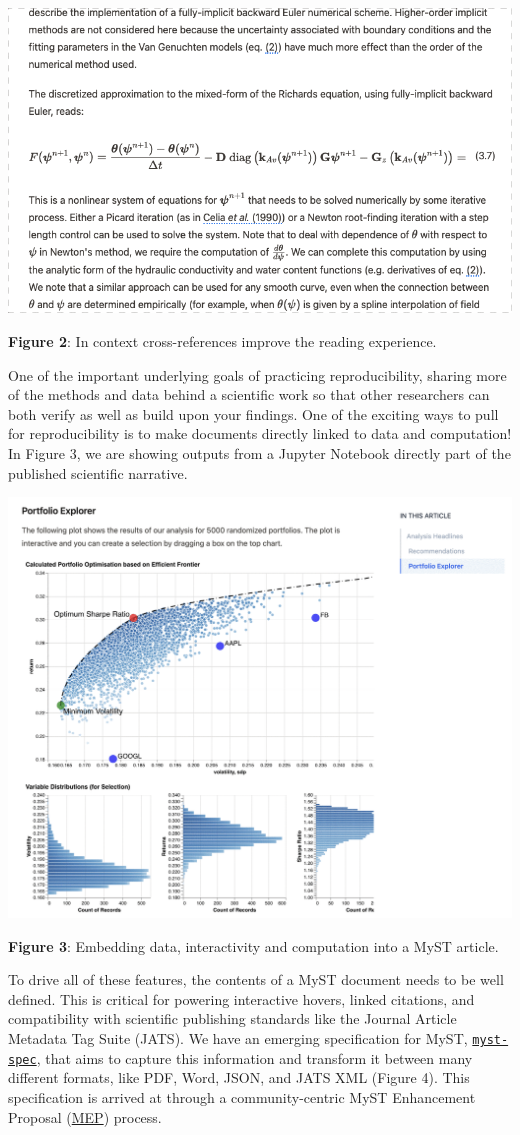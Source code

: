 \documentclass{article}
\begin{document}
\includegraphics[width=0.7\linewidth]{files/equations-30139d464ba14bca8632041fcf62fb11.png}


\textbf{Figure 2}: In context cross-references improve the reading experience.

One of the important underlying goals of practicing reproducibility, sharing more of the methods and data behind a scientific work so that other researchers can both verify as well as build upon your findings. One of the exciting ways to pull for reproducibility is to make documents directly linked to data and computation! In Figure 3, we are showing outputs from a Jupyter Notebook directly part of the published scientific narrative.

\includegraphics[width=0.7\linewidth]{files/interactive-b7ae9d0be86fc51f47cbba5886978eb5.png}


\textbf{Figure 3}: Embedding data, interactivity and computation into a MyST article.

To drive all of these features, the contents of a MyST document needs to be well defined. This is critical for powering interactive hovers, linked citations, and compatibility with scientific publishing standards like the Journal Article Metadata Tag Suite (JATS). We have an emerging specification for MyST, \href{https://spec.myst.tools}{\texttt{myst-spec}}, that aims to capture this information and transform it between many different formats, like PDF, Word, JSON, and JATS XML (Figure 4). This specification is arrived at through a community-centric MyST Enhancement Proposal (\href{https://compass.executablebooks.org/en/latest/meps.html}{MEP}) process.
\end{document}
